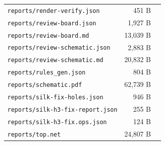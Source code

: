 \documentclass[11pt,a4paper]{article}
\begin{document}
{\begin{longtable}{p{9cm}rp{4cm}}
\texttt{reports/render-verify.json} & 451 B &  \\
\texttt{reports/review-board.json} & 1,927 B &  \\
\texttt{reports/review-board.md} & 13,039 B &  \\
\texttt{reports/review-schematic.json} & 2,883 B &  \\
\texttt{reports/review-schematic.md} & 20,832 B &  \\
\texttt{reports/rules\_gen.json} & 804 B &  \\
\texttt{reports/schematic.pdf} & 62,739 B &  \\
\texttt{reports/silk-fix-holes.json} & 946 B &  \\
\texttt{reports/silk-h3-fix-report.json} & 255 B &  \\
\texttt{reports/silk-h3-fix.ops.json} & 124 B &  \\
\texttt{reports/top.net} & 24,807 B &  \\
\bottomrule
\end{longtable}
}
\end{document}
